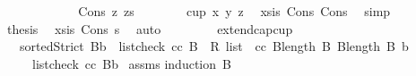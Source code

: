\begin{isabellebody}
\ \ \ \ \isamarkupfalse%
\isanewline
\ \ \ \ \ \ \isamarkupfalse%
\ {\isacharparenleft}{\kern0pt}Cons\ z\ zs{\isacharparenright}{\kern0pt}\isanewline
\ \ \ \ \ \ \isamarkupfalse%
\ {\isachardoublequoteopen}cup{}\ x\ y\ z{\isachardoublequoteclose}\ \isamarkupfalse%
\ xs{\isacharunderscore}{\kern0pt}is\ Cons\ Cons{}\ \isamarkupfalse%
\ simp\isanewline
\ \ \ \ \ \ \isamarkupfalse%
\ \isamarkupfalse%
\ {\isacharquery}{\kern0pt}thesis\ \isamarkupfalse%
\ xs{\isacharunderscore}{\kern0pt}is\ Cons\ s{}\ \isamarkupfalse%
\ auto\isanewline
\ \ \ \ \isamarkupfalse%
\isanewline
\ \ \isamarkupfalse%
\isanewline
{}\isamarkupfalse%
%
\endisatagproof
{\isafoldproof}%
%
\isadelimproof
\isanewline
%
\endisadelimproof
\isanewline
{}\isamarkupfalse%
\ extend{\isacharunderscore}{\kern0pt}cap{\isacharunderscore}{\kern0pt}cup{\isacharcolon}{\kern0pt}\isanewline
\ \ \ {\isachardoublequoteopen}sortedStrict\ {\isacharparenleft}{\kern0pt}B{\isacharat}{\kern0pt}{\isacharbrackleft}{\kern0pt}b{\isacharbrackright}{\kern0pt}{\isacharparenright}{\kern0pt}{\isachardoublequoteclose}\ \ {\isachardoublequoteopen}list{\isacharunderscore}{\kern0pt}check\ cc\ {\isacharparenleft}{\kern0pt}B\ {\isacharcolon}{\kern0pt}{\isacharcolon}{\kern0pt}\ R{}\ list{\isacharparenright}{\kern0pt}{\isachardoublequoteclose}\ \ {\isachardoublequoteopen}cc\ {\isacharparenleft}{\kern0pt}B{\isacharbang}{\kern0pt}{\isacharparenleft}{\kern0pt}length\ B{\isacharminus}{\kern0pt}{}{\isacharparenright}{\kern0pt}{\isacharparenright}{\kern0pt}\ {\isacharparenleft}{\kern0pt}B{\isacharbang}{\kern0pt}{\isacharparenleft}{\kern0pt}length\ B{\isacharminus}{\kern0pt}{}{\isacharparenright}{\kern0pt}{\isacharparenright}{\kern0pt}\ b{\isachardoublequoteclose}\isanewline
\ \ \ \ \ {\isachardoublequoteopen}list{\isacharunderscore}{\kern0pt}check\ cc\ {\isacharparenleft}{\kern0pt}B{\isacharat}{\kern0pt}{\isacharbrackleft}{\kern0pt}b{\isacharbrackright}{\kern0pt}{\isacharparenright}{\kern0pt}{\isachardoublequoteclose}\isanewline
%
\isadelimproof
%
\endisadelimproof
%
\isatagproof
{}\isamarkupfalse%
\ assms\isanewline
{}\isamarkupfalse%
{\isacharparenleft}{\kern0pt}induction\ B{\isacharparenright}{\kern0pt}\isanewline

\end{isabellebody}
